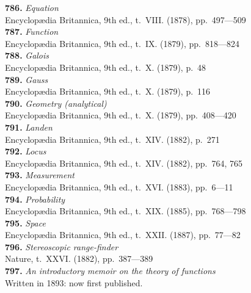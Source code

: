 \documentclass[12pt,a4paper,oneside]{book}
\theoremstyle{plain}
\theoremstyle{definition}
\theoremstyle{remark}
\begin{document}
\textbf{786.} \textit{Equation} \\
\hspace*{2em}Encyclop\ae{}dia Britannica, 9th ed., t.~VIII. (1878), pp.~497---509\\[0.3em]
\textbf{787.} \textit{Function} \\
\hspace*{2em}Encyclop\ae{}dia Britannica, 9th ed., t.~IX. (1879), pp.~818---824\\[0.3em]
\textbf{788.} \textit{Galois} \\
\hspace*{2em}Encyclop\ae{}dia Britannica, 9th ed., t.~X. (1879), p.~48\\[0.3em]
\textbf{789.} \textit{Gauss} \\
\hspace*{2em}Encyclop\ae{}dia Britannica, 9th ed., t.~X. (1879), p.~116\\[0.3em]
\textbf{790.} \textit{Geometry (analytical)} \\
\hspace*{2em}Encyclop\ae{}dia Britannica, 9th ed., t.~X. (1879), pp.~408---420\\[0.3em]
\textbf{791.} \textit{Landen} \\
\hspace*{2em}Encyclop\ae{}dia Britannica, 9th ed., t.~XIV. (1882), p.~271\\[0.3em]
\textbf{792.} \textit{Locus} \\
\hspace*{2em}Encyclop\ae{}dia Britannica, 9th ed., t.~XIV. (1882), pp.~764, 765\\[0.3em]
\textbf{793.} \textit{Measurement} \\
\hspace*{2em}Encyclop\ae{}dia Britannica, 9th ed., t.~XVI. (1883), pp.~6---11\\[0.3em]
\textbf{794.} \textit{Probability} \\
\hspace*{2em}Encyclop\ae{}dia Britannica, 9th ed., t.~XIX. (1885), pp.~768---798\\[0.3em]
\textbf{795.} \textit{Space} \\
\hspace*{2em}Encyclop\ae{}dia Britannica, 9th ed., t.~XXII. (1887), pp.~77---82\\[0.3em]
\textbf{796.} \textit{Stereoscopic range-finder} \\
\hspace*{2em}Nature, t.~XXVI. (1882), pp.~387---389\\[0.3em]
\textbf{797.} \textit{An introductory memoir on the theory of functions} \\
\hspace*{2em}Written in 1893: now first published.
\end{document}
